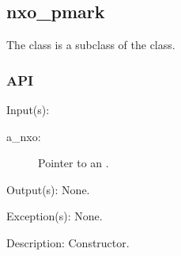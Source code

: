 %
%
%
%
%              

\subsection{nxo\_pmark}
\label{nxo_pmark}

The  class is a subclass of the  class.

\subsubsection{API}
\begin{capi}
\label{nxo_pmark_new}
	\begin{capilist}
	\item[Input(s): ]
		\begin{description}\item[]
		\item[a\_nxo: ]
			Pointer to an .
		\end{description}
	\item[Output(s): ] None.
	\item[Exception(s): ] None.
	\item[Description: ]
		Constructor.
	\end{capilist}
\end{capi}
